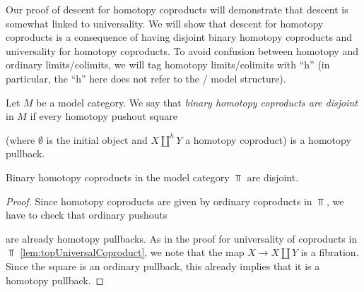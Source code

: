 Our proof of descent for homotopy coproducts will demonstrate that descent is somewhat linked to universality.
We will show that descent for homotopy coproducts is a consequence of having disjoint binary homotopy coproducts and universality for homotopy coproducts.
To avoid confusion between homotopy and ordinary limits/colimits, we will tag homotopy limits/colimits with ``h'' (in particular, the ``h'' here does not refer to the \Strom/ model structure).
\begin{definition}
    Let $M$ be a model category.
    We say that \emph{binary homotopy coproducts are disjoint} in $M$ if every homotopy pushout square
    \begin{center}
    \end{center}
    (where $\emptyset$ is the initial object and $X\coprod^h Y$ a homotopy coproduct) is a homotopy pullback.
\end{definition}
\begin{lemma}\label{lem:binCoprodDisjoint}
    Binary homotopy coproducts in the model category $\Top$ are disjoint.
    \begin{proof}
        Since homotopy coproducts are given by ordinary coproducts in $\Top$, we have to check that ordinary pushouts
        \begin{center}
        \end{center}
        are already homotopy pullbacks.
        As in the proof for universality of coproducts in $\Top$ \cref{lem:topUniversalCoproduct}, we note that the map $X\to X\coprod Y$ is a fibration.
        Since the square is an ordinary pullback, this already implies that it is a homotopy pullback.
    \end{proof}
\end{lemma}
